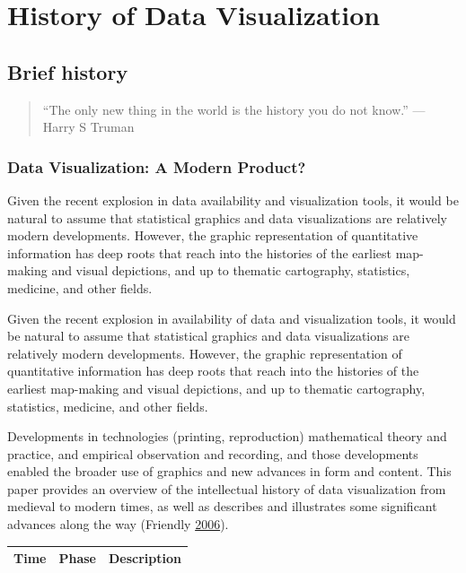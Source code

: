 \documentclass[]{book}
\theoremstyle{definition}
\theoremstyle{definition}
\theoremstyle{definition}
\theoremstyle{remark}
\begin{document}
\section{History of Data
Visualization}\label{history-of-data-visualization}

\subsection{Brief history}\label{brief-history}

\begin{quote}
``The only new thing in the world is the history you do not know.'' ---
Harry S Truman
\end{quote}

\subsubsection{Data Visualization: A Modern
Product?}\label{data-visualization-a-modern-product}

Given the recent explosion in data availability and visualization tools,
it would be natural to assume that statistical graphics and data
visualizations are relatively modern developments. However, the graphic
representation of quantitative information has deep roots that reach
into the histories of the earliest map-making and visual depictions, and
up to thematic cartography, statistics, medicine, and other fields.

Given the recent explosion in availability of data and visualization
tools, it would be natural to assume that statistical graphics and data
visualizations are relatively modern developments. However, the graphic
representation of quantitative information has deep roots that reach
into the histories of the earliest map-making and visual depictions, and
up to thematic cartography, statistics, medicine, and other fields.

Developments in technologies (printing, reproduction) mathematical
theory and practice, and empirical observation and recording, and those
developments enabled the broader use of graphics and new advances in
form and content. This paper provides an overview of the intellectual
history of data visualization from medieval to modern times, as well as
describes and illustrates some significant advances along the way
(Friendly \protect\hyperlink{ref-data_viz_history}{2006}).

\begin{longtable}[]{@{}lll@{}}
\toprule
\textbf{Time} & \textbf{Phase} & \textbf{Description}\tabularnewline
\midrule
\endhead
\bottomrule
\end{longtable}
\end{document}
